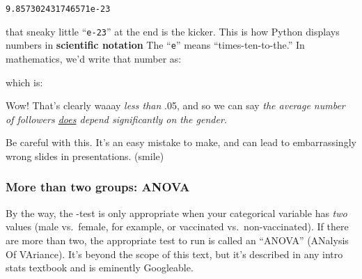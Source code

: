 \vspace{-.1in}
\begin{center}
\texttt{9.857302431746571e-23}
\end{center}
\vspace{-.1in}


that sneaky little ``\texttt{e-23}'' at the end is the kicker. This is how
Python displays numbers in \textbf{scientific notation} The
``\texttt{e}'' means ``times-ten-to-the.'' In mathematics, we'd write that
number as:

\vspace{-.2in}
\begin{center}
\end{center}
\vspace{-.2in}

which is:

\vspace{-.2in}
\begin{center}
\end{center}
\vspace{-.2in}

Wow! That's clearly waaay \textit{less than} .05, and so we can say \textit{the
average number of followers \underline{does} depend significantly on the gender.}

Be careful with this. It's an easy mistake to make, and can lead to
embarrassingly wrong slides in presentations. \textnormal{(smile)}

\subsubsection{More than two groups: ANOVA}


By the way, the -test is only appropriate when your categorical variable has
\textit{two} values (male vs.~female, for example, or vaccinated
vs.~non-vaccinated). If there are more than two, the appropriate test to run is
called an ``ANOVA'' (ANalysis Of VAriance). It's beyond the scope of this text,
but it's described in any intro stats textbook and is eminently Googleable.

